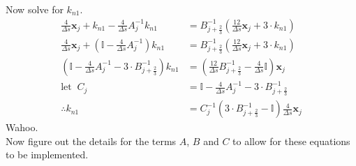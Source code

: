 \documentclass{article}
\begin{document}
Now solve for $k_{n1}$.
\begin{align*}
  \frac{4}{\Delta s}\bm{x}_j + k_{n1} - \frac{4}{\Delta s}A_j^{-1}k_{n1}  &= B_{j+\frac{2}{3}}^{-1}\left(\frac{12}{\Delta s}\bm{x}_j + 3\cdot k_{n1} \right)\\
   \frac{4}{\Delta s}\bm{x}_j + \left(\mathbb{I} -\frac{4}{\Delta s}A_j^{-1}\right)k_{n1} &= B_{j+\frac{2}{3}}^{-1}\left(\frac{12}{\Delta s}\bm{x}_j + 3\cdot k_{n1} \right)\\
   \left(\mathbb{I} - \frac{4}{\Delta s}A_j^{-1} - 3\cdot B_{j+\frac{2}{3}}^{-1}\right)k_{n1} &= \left(\frac{12}{\Delta s} B_{j+\frac{2}{3}}^{-1} - \frac{4}{\Delta s}\mathbb{I}\right)\bm{x}_j\\
   \mathrm{let\;\;} C_j &= \mathbb{I} - \frac{4}{\Delta s}A_j^{-1} - 3\cdot B_{j+\frac{2}{3}}^{-1}\\
   \therefore k_{n1} &= C_j^{-1}\left(3\cdot B_{j+\frac{2}{3}}^{-1} - \mathbb{I}\right)\frac{4}{\Delta s}\bm{x}_j
\end{align*}
Wahoo.\\
Now figure out the details for the terms $A$, $B$ and $C$ to allow for these equations to be implemented.
\end{document}

